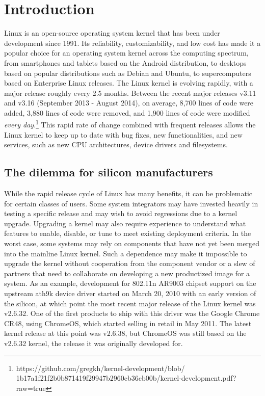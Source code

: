 \section{Introduction}

Linux is an open-source operating system kernel that has been under
development since 1991.  Its reliability, customizability, and low cost has
made it a popular choice for an operating system kernel across the
computing spectrum, from smartphones and tablets based on the Android
distribution, to desktops based on popular distributions such as Debian and
Ubuntu, to supercomputers based on Enterprise Linux releases.  The Linux
kernel is evolving rapidly, with a major release roughly every 2.5 months.
Between the recent major releases v3.11 and v3.16 (September 2013 - August
2014), on average, 8,700 lines of code were added, 3,880 lines of code
were removed, and 1,900 lines of code were modified {\em every
  day}.\footnote{https://github.com/gregkh/kernel-development/blob/
  1b17a1f21f2b0b871419f29947b2960cb36cb00b/kernel-development.pdf?raw=true}
This rapid rate of change combined with frequent releases allows the Linux
kernel to keep up to date with bug fixes, new functionalities, and new
services, such as new CPU architectures, device drivers and filesystems.

\subsection{The dilemma for silicon manufacturers}

While the rapid release cycle of Linux has many benefits, it can be
problematic for certain classes of users.  Some system integrators may have
invested heavily in testing a specific release and may wish to avoid
regressions due to a kernel upgrade.  Upgrading a kernel may also require
experience to understand what features to enable, disable, or tune to meet
existing deployment criteria. In the worst case, some systems may rely on
components that have not yet been merged into the mainline Linux kernel.
Such a dependence may make it impossible to upgrade the kernel without
cooperation from the component vendor or a slew of partners that need to
collaborate on developing a new productized image for a system.  As an
example, development for 802.11n AR9003 chipset support on the upstream
ath9k device driver started on March 20, 2010 with an early version of the
silicon, at which point the most recent major release of the Linux kernel
was v2.6.32.  One of the first products to ship with this driver was the Google
Chrome CR48, using ChromeOS, which started selling in retail in May 2011.
The latest kernel release at this point was v2.6.38, but ChromeOS was still
based on the v2.6.32 kernel, the release it was originally developed for.

